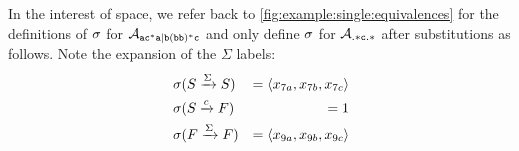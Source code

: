 \documentclass[acmsmall,review,anonymous,screen]{acmart}\settopmatter{printfolios=true,printccs=false,printacmref=true}
\theoremstyle{definition}
\begin{document}
In the interest of space, we refer back to
\cref{fig:example:single:equivalences} for the definitions of $\operatorname{\sigma}$ for
$\mathcal{A}_{\mathtt{ac^*a|b(bb)^*c}}$ and only define $\operatorname{\sigma}$ for $\mathcal{A}_{\mathtt{.*c.*}}{}$ after
substitutions as follows. Note the expansion of the $\Sigma$ labels:
    \begin{equation*}
      \begin{aligned}
        & \operatorname{\sigma}(S \xrightarrow{\Sigma} S) & = \left\langle x_{7a}, x_{7b}, x_{7c}\right\rangle \\
        & \operatorname{\sigma}(S \xrightarrow{c} F) & = 1 \\
        & \operatorname{\sigma}(F \xrightarrow{\Sigma} F) & = \left\langle x_{9a}, x_{9b}, x_{9c}\right\rangle \\
      \end{aligned}
    \end{equation*}
    
\end{document}
